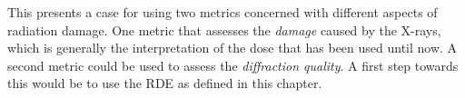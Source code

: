 This presents a case for using two metrics concerned with different aspects of radiation damage.
One metric that assesses the \textit{damage} caused by the X-rays, which is generally the interpretation of the dose that has been used until now.
A second metric could be used to assess the \textit{diffraction quality}.
A first step towards this would be to use the RDE as defined in this chapter.
